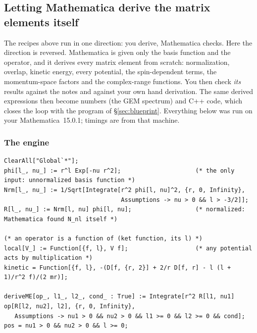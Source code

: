 \documentclass[11pt,a4paper]{article}
\numberwithin{equation}{section}
\theoremstyle{definition}
\theoremstyle{plain}
\theoremstyle{remark}
\numberwithin{algorithm}{section}
\begin{document}
\subsection{Letting Mathematica derive the matrix elements itself}\label{sec:mma-derive}
The recipes above run in one direction: you derive, Mathematica checks. Here the direction is reversed. Mathematica is given only the basis function and the operator, and it derives every matrix element from scratch: normalization, overlap, kinetic energy, every potential, the spin-dependent terms, the momentum-space factors and the complex-range functions. You then check \emph{its} results against the notes and against your own hand derivation. The same derived expressions then become numbers (the GEM spectrum) and C++ code, which closes the loop with the program of \S\ref{sec:blueprint}. Everything below was run on your Mathematica~15.0.1; timings are from that machine.

\subsubsection{The engine}\label{sec:mma-engine}
\begin{lstlisting}[style=wl]
ClearAll["Global`*"];
phi[l_, nu_] := r^l Exp[-nu r^2];                     (* the only input: unnormalized basis function *)
Nrm[l_, nu_] := 1/Sqrt[Integrate[r^2 phi[l, nu]^2, {r, 0, Infinity},
                                 Assumptions -> nu > 0 && l > -3/2]];
R[l_, nu_] := Nrm[l, nu] phi[l, nu];                  (* normalized: Mathematica found N_nl itself *)

(* an operator is a function of (ket function, its l) *)
local[V_] := Function[{f, l}, V f];                   (* any potential acts by multiplication *)
kinetic = Function[{f, l}, -(D[f, {r, 2}] + 2/r D[f, r] - l (l + 1)/r^2 f)/(2 mr)];

deriveME[op_, l1_, l2_, cond_ : True] := Integrate[r^2 R[l1, nu1] op[R[l2, nu2], l2], {r, 0, Infinity},
   Assumptions -> nu1 > 0 && nu2 > 0 && l1 >= 0 && l2 >= 0 && cond];
pos = nu1 > 0 && nu2 > 0 && l >= 0;
\end{lstlisting}
\end{document}
